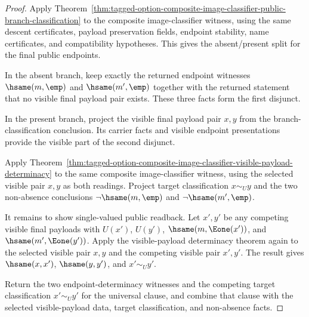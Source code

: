 \begin{proof}
Apply
Theorem~\ref{thm:tagged-option-composite-image-classifier-public-branch-classification}
to the composite image-classifier witness, using the same descent certificates,
payload preservation fields, endpoint stability, name certificates, and
compatibility hypotheses. This gives the absent/present split for the final
public endpoints.

In the absent branch, keep exactly the returned endpoint witnesses
$\hsame(m,\emp)$ and $\hsame(m',\emp)$ together with the returned statement that
no visible final payload pair exists. These three facts form the first
disjunct.

In the present branch, project the visible final payload pair $x,y$ from the
branch-classification conclusion. Its carrier facts and visible endpoint
presentations provide the visible part of the second disjunct.

Apply
Theorem~\ref{thm:tagged-option-composite-image-classifier-visible-payload-determinacy}
to the same composite image-classifier witness, using the selected visible pair
$x,y$ as both readings. Project target classification $x\sim_U y$ and the two
non-absence conclusions $\neg\hsame(m,\emp)$ and $\neg\hsame(m',\emp)$.

It remains to show single-valued public readback. Let $x',y'$ be any competing
visible final payloads with $U(x')$, $U(y')$, $\hsame(m,\Eone(x'))$, and
$\hsame(m',\Eone(y'))$. Apply the visible-payload determinacy theorem again to
the selected visible pair $x,y$ and the competing visible pair $x',y'$. The
result gives $\hsame(x,x')$, $\hsame(y,y')$, and $x'\sim_U y'$.

Return the two endpoint-determinacy witnesses and the competing target
classification $x'\sim_U y'$ for the universal clause, and combine that clause
with the selected visible-payload data, target classification, and non-absence
facts.
\end{proof}

